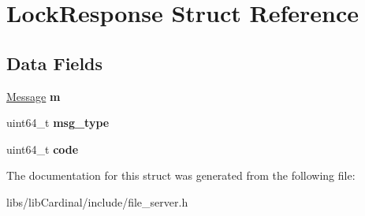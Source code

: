 \hypertarget{structLockResponse}{}\section{Lock\+Response Struct Reference}
\label{structLockResponse}
\subsection*{Data Fields}
\begin{DoxyCompactItemize}
\item 
\hyperlink{structMessage}{Message} {\bfseries m}\hypertarget{structLockResponse_a3457e9e144efe5f9b48b1d17a96d1a40}{}\label{structLockResponse_a3457e9e144efe5f9b48b1d17a96d1a40}

\item 
uint64\+\_\+t {\bfseries msg\+\_\+type}\hypertarget{structLockResponse_add999309182f2d4c6b46b0fab912e61d}{}\label{structLockResponse_add999309182f2d4c6b46b0fab912e61d}

\item 
uint64\+\_\+t {\bfseries code}\hypertarget{structLockResponse_a38bfcf44029e55db80f3393190019332}{}\label{structLockResponse_a38bfcf44029e55db80f3393190019332}

\end{DoxyCompactItemize}


The documentation for this struct was generated from the following file\+:\begin{DoxyCompactItemize}
\item 
libs/lib\+Cardinal/include/file\+\_\+server.\+h\end{DoxyCompactItemize}
